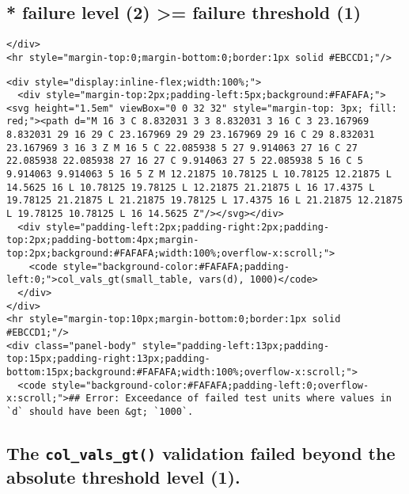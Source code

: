 \documentclass[
]{article}
\begin{document}
\hypertarget{failure-level-2-failure-threshold-1}{%
\subsection{* failure level (2) \textgreater= failure threshold
(1)}\label{failure-level-2-failure-threshold-1}}

\begin{verbatim}
</div>
<hr style="margin-top:0;margin-bottom:0;border:1px solid #EBCCD1;"/>
\end{verbatim}

\begin{verbatim}
<div style="display:inline-flex;width:100%;">
  <div style="margin-top:2px;padding-left:5px;background:#FAFAFA;"><svg height="1.5em" viewBox="0 0 32 32" style="margin-top: 3px; fill: red;"><path d="M 16 3 C 8.832031 3 3 8.832031 3 16 C 3 23.167969 8.832031 29 16 29 C 23.167969 29 29 23.167969 29 16 C 29 8.832031 23.167969 3 16 3 Z M 16 5 C 22.085938 5 27 9.914063 27 16 C 27 22.085938 22.085938 27 16 27 C 9.914063 27 5 22.085938 5 16 C 5 9.914063 9.914063 5 16 5 Z M 12.21875 10.78125 L 10.78125 12.21875 L 14.5625 16 L 10.78125 19.78125 L 12.21875 21.21875 L 16 17.4375 L 19.78125 21.21875 L 21.21875 19.78125 L 17.4375 16 L 21.21875 12.21875 L 19.78125 10.78125 L 16 14.5625 Z"/></svg></div>
  <div style="padding-left:2px;padding-right:2px;padding-top:2px;padding-bottom:4px;margin-top:2px;background:#FAFAFA;width:100%;overflow-x:scroll;">
    <code style="background-color:#FAFAFA;padding-left:0;">col_vals_gt(small_table, vars(d), 1000)</code>
  </div>
</div>
<hr style="margin-top:10px;margin-bottom:0;border:1px solid #EBCCD1;"/>
<div class="panel-body" style="padding-left:13px;padding-top:15px;padding-right:13px;padding-bottom:15px;background:#FAFAFA;width:100%;overflow-x:scroll;">
  <code style="background-color:#FAFAFA;padding-left:0;overflow-x:scroll;">## Error: Exceedance of failed test units where values in `d` should have been &gt; `1000`.
\end{verbatim}

\hypertarget{the-col_vals_gt-validation-failed-beyond-the-absolute-threshold-level-1.}{%
\subsection{\texorpdfstring{The \texttt{col\_vals\_gt()} validation
failed beyond the absolute threshold level
(1).}{The col\_vals\_gt() validation failed beyond the absolute threshold level (1).}}\label{the-col_vals_gt-validation-failed-beyond-the-absolute-threshold-level-1.}}
\end{document}
